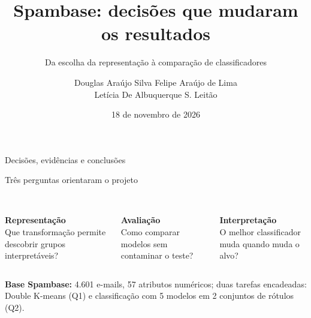 \documentclass[aspectratio=169,11pt]{beamer}
\title[Spambase | Decisões]{\textbf{Spambase: decisões que mudaram os resultados}}
\subtitle{Da escolha da representação à comparação de classificadores}
\author[Douglas, Felipe e Leticia]{Douglas Ara\'ujo Silva \quad Felipe Ara\'ujo de Lima \\ Let\'icia De Albuquerque S. Leit\~ao}
\institute[CIn/UFPE]{Aprendizagem de M\'aquina -- IN1102 | P\'os-gradua\c c\~ao, CIn/UFPE}
\date{18 de novembro de 2026}
\begin{document}
\begin{frame}[plain]
\vspace{8mm}
\titlepage
\begin{center}
\end{center}
\vspace{1mm}
\centering\small\color{cinzaescuro}Decisões, evidências e conclusões
\end{frame}

\begin{frame}[t]{Três perguntas orientaram o projeto}
\vspace{1mm}
\begin{columns}[T,onlytextwidth]
\begin{simplebox}
\\[1mm]
\textbf{Representação}\\[2mm]
\small Que transformação permite descobrir grupos interpretáveis?
\end{simplebox}
\begin{simplebox}
\\[1mm]
\textbf{Avaliação}\\[2mm]
\small Como comparar modelos sem contaminar o teste?
\end{simplebox}
\begin{simplebox}
\\[1mm]
\textbf{Interpretação}\\[2mm]
\small O melhor classificador muda quando muda o alvo?
\end{simplebox}
\end{columns}
\vspace{3mm}
\begin{notabox}
\small \textbf{Base Spambase:} 4.601 e-mails, 57 atributos numéricos; duas tarefas encadeadas:
Double K-means (Q1) e classificação com 5 modelos em 2 conjuntos de rótulos (Q2).
\end{notabox}
\end{frame}
\end{document}

